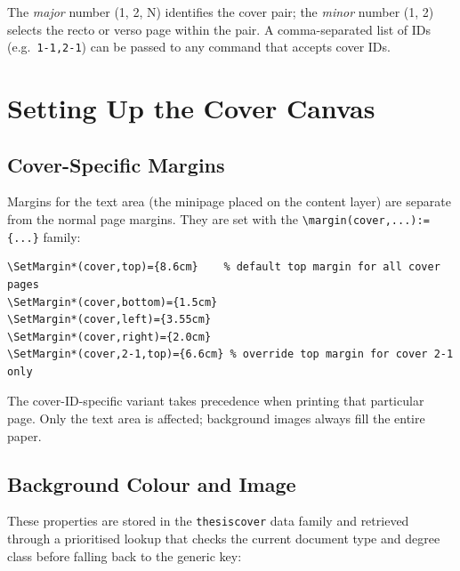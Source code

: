The \emph{major} number (1, 2, N) identifies the cover pair; the \emph{minor}
number (1, 2) selects the recto or verso page within the pair.  A
comma-separated list of IDs (e.g.\ \verb!1-1,2-1!) can be passed to any
command that accepts cover IDs.


\section{Setting Up the Cover Canvas}
\label{sec:covers_canvas}

\subsection{Cover-Specific Margins}
\label{sec:covers_margins}

Margins for the text area (the minipage placed on the content layer) are
separate from the normal page margins.  They are set with the
\verb!\margin(cover,...):={...}! family:

\begin{verbatim}
\SetMargin*(cover,top)={8.6cm}    % default top margin for all cover pages
\SetMargin*(cover,bottom)={1.5cm}
\SetMargin*(cover,left)={3.55cm}
\SetMargin*(cover,right)={2.0cm}
\SetMargin*(cover,2-1,top)={6.6cm} % override top margin for cover 2-1 only
\end{verbatim}

The cover-ID-specific variant takes precedence when printing that particular
page.  Only the text area is affected; background images always fill the
entire paper.


\subsection{Background Colour and Image}
\label{sec:covers_bg}

These properties are stored in the \texttt{thesiscover} data family and
retrieved through a prioritised lookup that checks the current document type
and degree class before falling back to the generic key:

